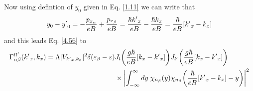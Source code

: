 \noindent
Now using defintion of $y_0$ given in Eq. \eqref{1.11} we can write that
\begin{equation} \label{4.57}
    y_0 - {y'}_0 =
    - \frac{p_{x_{\alpha}}}{eB} + \frac{p_{x_{\beta}}}{eB} =
    \frac{\hbar {k'}_x}{eB} - \frac{\hbar {k}_x}{eB} =
    \frac{\hbar}{eB} \qty[{k'}_x - {k}_x]
\end{equation}
and this leads Eq. \eqref{4.56} to
\begin{equation} \label{4.58}
  \begin{aligned}
    \Gamma_{\alpha\beta}^{ll'}({k'}_x,k_x) =
    \Lambda |V_{{k'}_x,k_x}|^2
    \delta(\varepsilon_{\beta} - \varepsilon) &
    J_l\qty(\frac{g\hbar}{eB}[{k}_x - {k'}_x])
    J_{l'}\qty(\frac{g\hbar}{eB}[{k}_x - {k'}_x]) \\
    & \times
    \qty|
    \int_{-\infty}^{\infty} dy \;
    {\chi}_{n_{\beta}}\qty(y)
    {\chi}_{n_{\beta}}\qty(\frac{\hbar}{eB} \qty[{k'}_x - {k}_x] - y)|^2
  \end{aligned}
\end{equation}

